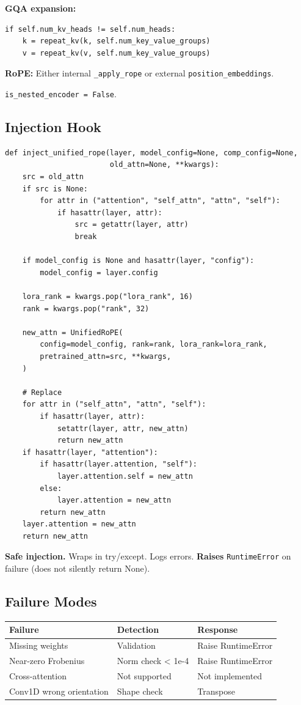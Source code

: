 \textbf{GQA expansion:}
\begin{lstlisting}
if self.num_kv_heads != self.num_heads:
    k = repeat_kv(k, self.num_key_value_groups)
    v = repeat_kv(v, self.num_key_value_groups)
\end{lstlisting}

\textbf{RoPE:} Either internal \texttt{\_apply\_rope} or external \texttt{position\_embeddings}.

\texttt{is\_nested\_encoder = False}.

\subsection{Injection Hook}

\begin{lstlisting}
def inject_unified_rope(layer, model_config=None, comp_config=None,
                        old_attn=None, **kwargs):
    src = old_attn
    if src is None:
        for attr in ("attention", "self_attn", "attn", "self"):
            if hasattr(layer, attr):
                src = getattr(layer, attr)
                break
    
    if model_config is None and hasattr(layer, "config"):
        model_config = layer.config
    
    lora_rank = kwargs.pop("lora_rank", 16)
    rank = kwargs.pop("rank", 32)
    
    new_attn = UnifiedRoPE(
        config=model_config, rank=rank, lora_rank=lora_rank,
        pretrained_attn=src, **kwargs,
    )
    
    # Replace
    for attr in ("self_attn", "attn", "self"):
        if hasattr(layer, attr):
            setattr(layer, attr, new_attn)
            return new_attn
    if hasattr(layer, "attention"):
        if hasattr(layer.attention, "self"):
            layer.attention.self = new_attn
        else:
            layer.attention = new_attn
        return new_attn
    layer.attention = new_attn
    return new_attn
\end{lstlisting}

\textbf{Safe injection.} Wraps in try/except. Logs errors. \textbf{Raises} 
\texttt{RuntimeError} on failure (does not silently return None).

\subsection{Failure Modes}

\begin{table}[H]
\centering
\small
\begin{tabular}{lll}
\toprule
\textbf{Failure} & \textbf{Detection} & \textbf{Response} \\
\midrule
Missing weights & Validation & Raise RuntimeError \\
Near-zero Frobenius & Norm check < 1e-4 & Raise RuntimeError \\
Cross-attention & Not supported & Not implemented \\
Conv1D wrong orientation & Shape check & Transpose \\
\bottomrule
\end{tabular}
\end{table}

